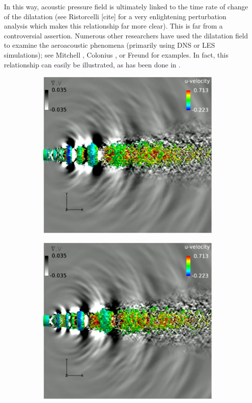In this way, acoustic pressure field is ultimately linked to the time rate of change of the dilatation (see Ristorcelli [cite] for a very enlightening perturbation analysis which makes this relationship far more clear).
This is far from a controversial assertion.
Numerous other researchers have used the dilatation field to examine the aeroacoustic phenomena (primarily using DNS or LES simulations); see Mitchell \etal [cite 1995], Colonius \etal [cite 1997], or Freund \etal [cite 2000] for examples.
In fact, this relationship can easily be illustrated, as has been done in . 
\begin{figure}
	\centering
	\begin{subfigure}{.5\textwidth}
		\centering
		\includegraphics[width=0.95\linewidth]{Figures/LES_dilatation1.jpg}
		\caption{}
	\end{subfigure}%
	\begin{subfigure}{.5\textwidth}
		\centering
		\includegraphics[width=0.95\linewidth]{Figures/LES_dilatation2.jpg}

\end{subfigure}
\end{figure}
